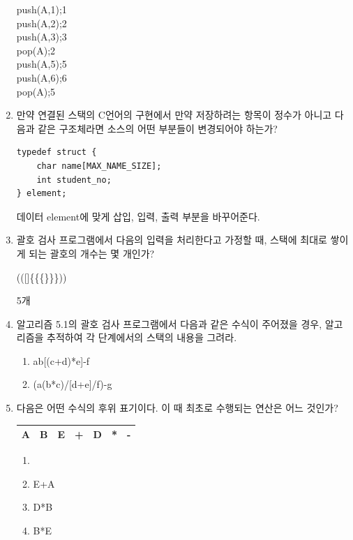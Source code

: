 \documentclass[11pt,a4paper]{article}
\begin{document}
\begin{enumerate}
push(A,1);\hspace{2cm}1\\push(A,2);\hspace{2cm}2\\push(A,3);\hspace{2cm}3\\
pop(A);\hspace{2.5cm}2\\
push(A,5);\hspace{2cm}5\\push(A,6);\hspace{2cm}6\\pop(A);\hspace{2.5cm}5\\

\item 만약 연결된 스택의 C언어의 구현에서 만약 저장하려는 항목이 정수가 아니고 다음과 같은 구조체라면 소스의 어떤 부분들이 변경되어야 하는가?

\begin{lstlisting}[frame=none]
typedef struct {
	char name[MAX_NAME_SIZE];
	int student_no;
} element;
\end{lstlisting}
데이터 element에 맞게 삽입, 입력, 출력 부분을 바꾸어준다.

\item 괄호 검사 프로그램에서 다음의 입력을 처리한다고 가정할 때, 스택에 최대로 쌓이게 되는 괄호의 개수는 몇 개인가?

(([]\{\{\{\}\}\}))

5개

\item 알고리즘 5.1의 괄호 검사 프로그램에서 다음과 같은 수식이 주어졌을 경우, 알고리즘을 추적하여 각 단계에서의 스택의 내용을 그려라. 
\begin{enumerate}
	\item a{b[(c+d)*e]-f}
	\item {(a(b*c)/[d+e]/f)-g}
\end{enumerate}

\item 다음은 어떤 수식의 후위 표기이다. 이 때 최초로 수행되는 연산은 어느 것인가?

\begin{tabular}{|c|c|c|c|c|c|c|}
\hline
A&B&E&+&D&*&-\\
\hline
\end{tabular}

\begin{enumerate}
	\item {}
	\item E+A
	\item D*B
	\item B*E
\end{enumerate}
	

\end{enumerate}
\end{document}
